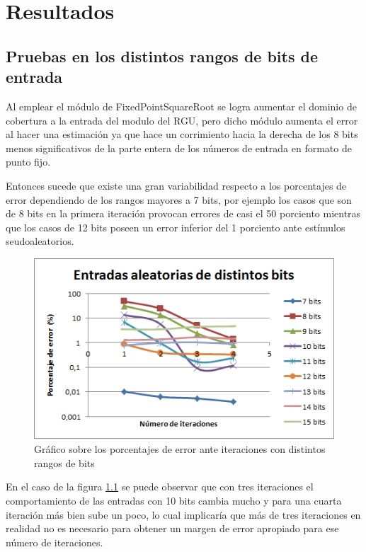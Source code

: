 \chapter{Resultados}

\section{Pruebas en los distintos rangos de bits de entrada}

Al emplear el módulo de FixedPointSquareRoot se logra aumentar el dominio de cobertura a la entrada del modulo del RGU, pero dicho módulo aumenta el error al hacer una estimación ya que hace un corrimiento hacia la derecha de los 8 bits menos significativos de la parte entera de los números de entrada en formato de punto fijo.

Entonces sucede que existe una gran variabilidad respecto a los porcentajes de error dependiendo de los rangos mayores a 7 bits, por ejemplo los casos que son de 8 bits en la primera iteración provocan errores de casi el 50 porciento mientras que los casos de 12 bits poseen un error inferior del 1 porciento ante estímulos seudoaleatorios.

\begin{figure}
	\includegraphics[width=0.7\linewidth]{images/puntos}
	\caption{Gráfico sobre los porcentajes de error ante iteraciones con distintos rangos de bits} \label{fig:puntos}
\end{figure}

En el caso de la figura \ref{fig:puntos} se puede observar que con tres iteraciones el comportamiento de las entradas con 10 bits cambia mucho y para una cuarta iteración más bien sube un poco, lo cual implicaría que más de tres iteraciones en realidad no es necesario para obtener un margen de error apropiado para ese número de iteraciones.

